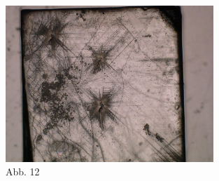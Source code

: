 \documentclass[12pt,a4paper]{scrartcl}
\numberwithin{equation}{section} %
\begin{document}
\begin{figure}[ht]
	\begin{minipage}[t]{\linewidth}
		\centering
		\includegraphics[width=0.7\textwidth]{../media/B2.8/Druck_uebersicht.pdf}
		\caption{Abb. 12}
		\label{abb:Druck all}
	\end{minipage}
	

\end{figure}
\end{document}
